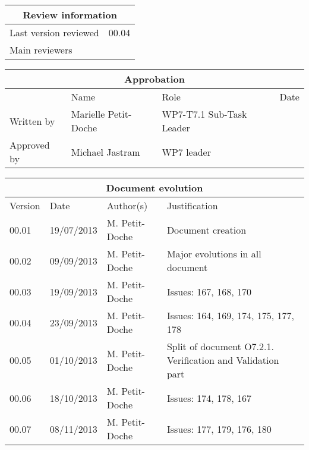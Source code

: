 \documentclass{template/openetcs_report}
\begin{document}
\begin{tabular}{|p{4.4cm}|p{8.7cm}|}
\hline
\multicolumn{2}{|c|}{Review information} \\
\hline
Last version reviewed & 00.04 \\
\hline
Main reviewers &  \\
 
\hline
\end{tabular}

\begin{tabular}{|p{2.2cm}|p{4cm}|p{4cm}|p{2cm}|}
\hline
\multicolumn{4}{|c|}{Approbation} \\
\hline
  &  Name & Role & Date   \\
\hline  
Written by    &  Marielle Petit-Doche & WP7-T7.1 Sub-Task Leader  & \\
\hline
Approved by & Michael Jastram & WP7 leader & \\
\hline
\end{tabular}

\begin{tabular}{|p{2.2cm}|p{2cm}|p{3cm}|p{5cm}|}
\hline
\multicolumn{4}{|c|}{Document evolution} \\
\hline
Version &  Date & Author(s) & Justification  \\
\hline  
00.01 & 19/07/2013 & M. Petit-Doche &  Document creation  \\
00.02 & 09/09/2013 & M. Petit-Doche &  Major evolutions in all document  \\
00.03 & 19/09/2013 & M. Petit-Doche &  Issues: 167, 168, 170  \\
00.04 & 23/09/2013 & M. Petit-Doche &  Issues: 164, 169, 174, 175, 177, 178  \\
00.05 & 01/10/2013 & M. Petit-Doche &  Split of document O7.2.1. Verification and Validation part \\
00.06 & 18/10/2013 & M. Petit-Doche &  Issues: 174, 178, 167\\
00.07 & 08/11/2013 & M. Petit-Doche &  Issues: 177, 179, 176, 180 \\
\hline  
\end{tabular}



\newcommand{\tbd}{\colorbox{cyan}{\%\%To Be Defined\%\%}}
\newcommand{\tbc}{\colorbox{cyan}{\%\%To Be Confirmed\%\%}}
\newcommand{\todo}[1]{\colorbox{cyan}{\%\%{#1}\%\%}}
\newlength{\origindent}
\end{document}
